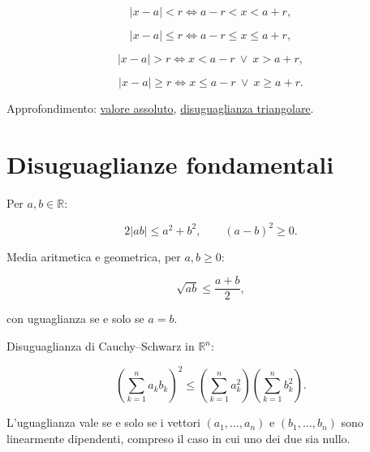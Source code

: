 \[
|x-a|<r\Longleftrightarrow a-r<x<a+r,
\]

\[
|x-a|\le r\Longleftrightarrow a-r\le x\le a+r,
\]

\[
|x-a|>r\Longleftrightarrow x<a-r\ \lor\ x>a+r,
\]

\[
|x-a|\ge r\Longleftrightarrow x\le a-r\ \lor\ x\ge a+r.
\]

Approfondimento: \href{https://ingegnerismo.it/matematica/valore-assoluto/}{valore assoluto}, \href{https://ingegnerismo.it/matematica/disuguaglianza-triangolare/}{disuguaglianza triangolare}.

\section{Disuguaglianze fondamentali}\label{disuguaglianze-fondamentali}

Per \(a,b\in\mathbb R\):

\[
2|ab|\le a^2+b^2,
\qquad
(a-b)^2\ge0.
\]

Media aritmetica e geometrica, per \(a,b\ge0\):

\[
\sqrt{ab}\le\frac{a+b}{2},
\]

con uguaglianza se e solo se \(a=b\).

Disuguaglianza di Cauchy--Schwarz in \(\mathbb R^n\):

\[
\left(\sum_{k=1}^{n}a_kb_k\right)^2
\le
\left(\sum_{k=1}^{n}a_k^2\right)
\left(\sum_{k=1}^{n}b_k^2\right).
\]

L'uguaglianza vale se e solo se i vettori \((a_1,\ldots,a_n)\) e \((b_1,\ldots,b_n)\) sono linearmente dipendenti, compreso il caso in cui uno dei due sia nullo.
